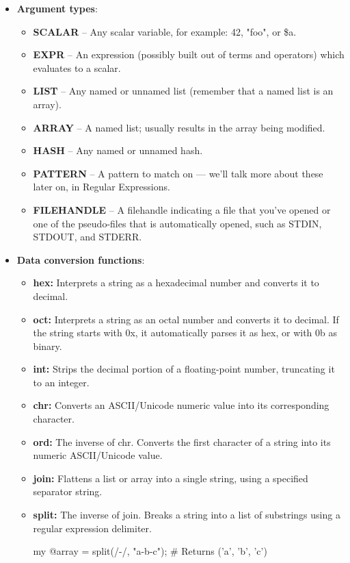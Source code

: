 \documentclass{report}
\begin{document}
\begin{itemize}
        \item \textbf{Argument types}: 
            \begin{itemize}
                \item \textbf{SCALAR} -- Any scalar variable, for example: 42, "foo", or \$a.
                \item \textbf{EXPR} -- An expression (possibly built out of terms and operators) which evaluates to a scalar.
                \item \textbf{LIST} -- Any named or unnamed list (remember that a named list is an array).
                \item \textbf{ARRAY} -- A named list; usually results in the array being modified.
                \item \textbf{HASH} -- Any named or unnamed hash.
                \item \textbf{PATTERN} -- A pattern to match on --- we’ll talk more about these later on, in Regular Expressions.
                \item \textbf{FILEHANDLE} -- A filehandle indicating a file that you’ve opened or one of the pseudo-files that is automatically opened, such as STDIN, STDOUT, and STDERR.
            \end{itemize}
        \item \textbf{Data conversion functions}: 
            \begin{itemize}
                \item \textbf{hex:} Interprets a string as a hexadecimal number and converts it to decimal.
                \item \textbf{oct:} Interprets a string as an octal number and converts it to decimal. If the string starts with 0x, it automatically parses it as hex, or with 0b as binary.
                \item \textbf{int:} Strips the decimal portion of a floating-point number, truncating it to an integer.
                \item \textbf{chr:} Converts an ASCII/Unicode numeric value into its corresponding character.
                \item \textbf{ord:} The inverse of chr. Converts the first character of a string into its numeric ASCII/Unicode value.
                \item \textbf{join:} Flattens a list or array into a single string, using a specified separator string.
                    \bigbreak \noindent 
                \item \textbf{split:} The inverse of join. Breaks a string into a list of substrings using a regular expression delimiter.
                    \bigbreak \noindent 
                    \begin{perlcode}
                        my @array = split(/-/, "a-b-c"); # Returns ('a', 'b', 'c')
                    \end{perlcode}
            \end{itemize}



\end{itemize}
\end{document}
